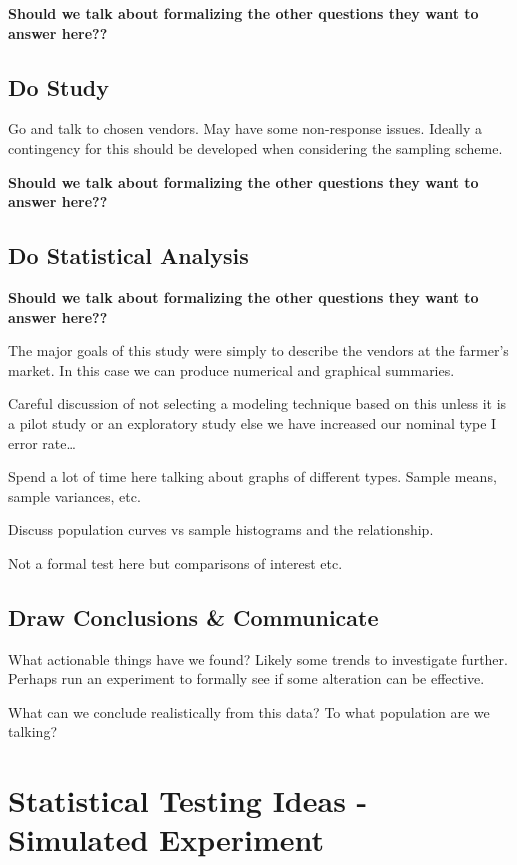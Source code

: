 \documentclass[
]{book}
\theoremstyle{definition}
\theoremstyle{definition}
\theoremstyle{definition}
\theoremstyle{remark}
\begin{document}
\textbf{Should we talk about formalizing the other questions they want to answer here??}

\hypertarget{do-study}{%
\subsection{Do Study}\label{do-study}}

Go and talk to chosen vendors. May have some non-response issues. Ideally a contingency for this should be developed when considering the sampling scheme.

\textbf{Should we talk about formalizing the other questions they want to answer here??}

\hypertarget{do-statistical-analysis}{%
\subsection{Do Statistical Analysis}\label{do-statistical-analysis}}

\textbf{Should we talk about formalizing the other questions they want to answer here??}

The major goals of this study were simply to describe the vendors at the farmer's market. In this case we can produce numerical and graphical summaries.

Careful discussion of not selecting a modeling technique based on this unless it is a pilot study or an exploratory study else we have increased our nominal type I error rate\ldots{}

Spend a lot of time here talking about graphs of different types. Sample means, sample variances, etc.

Discuss population curves vs sample histograms and the relationship.

Not a formal test here but comparisons of interest etc.

\hypertarget{draw-conclusions-communicate}{%
\subsection{Draw Conclusions \& Communicate}\label{draw-conclusions-communicate}}

What actionable things have we found? Likely some trends to investigate further. Perhaps run an experiment to formally see if some alteration can be effective.

What can we conclude realistically from this data? To what population are we talking?

\hypertarget{statistical-testing-ideas---simulated-experiment}{%
\section{Statistical Testing Ideas - Simulated Experiment}\label{statistical-testing-ideas---simulated-experiment}}
\end{document}
